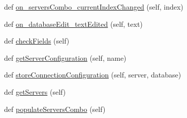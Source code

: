 \begin{DoxyCompactItemize}
\item 
def \mbox{\hyperlink{class_dsg_tools_1_1_db_tools_1_1_post_g_i_s_tool_1_1postgis_d_b_tool_1_1_postgis_d_b_tool_a178ff6c2aabf82309a66883491504599}{on\+\_\+servers\+Combo\+\_\+current\+Index\+Changed}} (self, index)
\item 
def \mbox{\hyperlink{class_dsg_tools_1_1_db_tools_1_1_post_g_i_s_tool_1_1postgis_d_b_tool_1_1_postgis_d_b_tool_aeb812c56db030d52993aa07b1536f97c}{on\+\_\+database\+Edit\+\_\+text\+Edited}} (self, text)
\item 
def \mbox{\hyperlink{class_dsg_tools_1_1_db_tools_1_1_post_g_i_s_tool_1_1postgis_d_b_tool_1_1_postgis_d_b_tool_a7a723df457ddb1705bca7e8ba65585bb}{check\+Fields}} (self)
\item 
def \mbox{\hyperlink{class_dsg_tools_1_1_db_tools_1_1_post_g_i_s_tool_1_1postgis_d_b_tool_1_1_postgis_d_b_tool_acde88709ce710f8609f29deb9c50c4e9}{get\+Server\+Configuration}} (self, name)
\item 
def \mbox{\hyperlink{class_dsg_tools_1_1_db_tools_1_1_post_g_i_s_tool_1_1postgis_d_b_tool_1_1_postgis_d_b_tool_aefe5dcf655069dd0aa32d5d9ea668239}{store\+Connection\+Configuration}} (self, server, database)
\item 
def \mbox{\hyperlink{class_dsg_tools_1_1_db_tools_1_1_post_g_i_s_tool_1_1postgis_d_b_tool_1_1_postgis_d_b_tool_abbb0bbb9e0f488feb77fdea7b220f6d0}{get\+Servers}} (self)
\item 
def \mbox{\hyperlink{class_dsg_tools_1_1_db_tools_1_1_post_g_i_s_tool_1_1postgis_d_b_tool_1_1_postgis_d_b_tool_aebb08bed4f8c5d2154bc4161fde9ac54}{populate\+Servers\+Combo}} (self)
\end{DoxyCompactItemize}
